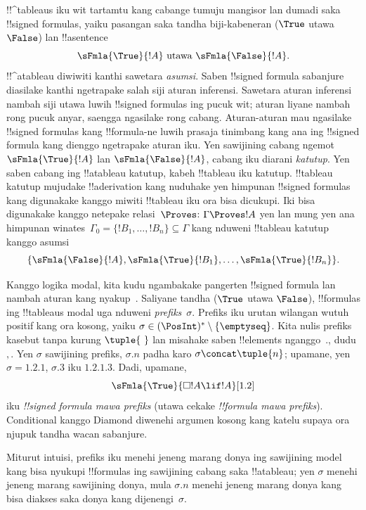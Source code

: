 \documentclass[../../../include/open-logic-section]{subfiles}
\begin{document}


!!^{tableau}s iku wit tartamtu kang cabange tumuju mangisor lan dumadi
saka !!{signed
  formula}s, yaiku pasangan saka tandha biji-kabeneran
($\True$ utawa $\False$) lan !!a{sentence}
\[
\sFmla{\True}{!A} \text{ utawa } \sFmla{\False}{!A}.
\]
!!^a{tableau} diwiwiti kanthi sawetara \emph{asumsi}. Saben
!!{signed formula} sabanjure diasilake kanthi ngetrapake salah siji
aturan inferensi. Sawetara aturan inferensi nambah siji utawa luwih
!!{signed formula}s ing pucuk wit; aturan liyane nambah rong pucuk
anyar, saengga ngasilake rong cabang. Aturan-aturan mau ngasilake
!!{signed formula}s kang !!{formula}-ne luwih prasaja tinimbang
kang ana ing !!{signed formula} kang dienggo ngetrapake aturan iku.
Yen sawijining cabang ngemot $\sFmla{\True}{!A}$ lan
$\sFmla{\False}{!A}$, cabang iku diarani \emph{katutup}. Yen saben
cabang ing !!a{tableau} katutup, kabeh !!{tableau} iku katutup.
!!{tableau} katutup mujudake !!a{derivation} kang nuduhake yen
himpunan !!{signed formula}s kang digunakake kanggo miwiti
!!{tableau} iku ora bisa dicukupi. Iki bisa digunakake kanggo
netepake relasi~$\Proves$:
$\Gamma \Proves !A$ yen lan mung yen ana himpunan winates~$\Gamma_0 = \{!B_1,
\dots, !B_n\} \subseteq \Gamma$ kang nduweni !!{tableau} katutup
kanggo asumsi
\[
\{\sFmla{\False}{!A}, \sFmla{\True}{!B_1}, \dots, \sFmla{\True}{!B_n}\}.
\]

Kanggo logika modal, kita kudu ngambakake pangerten !!{signed
formula} lan nambah aturan kang nyakup~. Saliyane tandha ($\True$ utawa
$\False$), !!{formula}s ing !!{tableau}s modal uga nduweni
\emph{prefiks}~$\sigma$. Prefiks iku urutan wilangan wutuh positif
kang ora kosong, yaiku $\sigma \in (\PosInt)^* \setminus
\{\emptyseq\}$. Kita nulis prefiks kasebut tanpa kurung
$\tuple{\ }$ lan misahake saben !!{element}s nganggo~$.$,
dudu $,$. Yen $\sigma$ sawijining prefiks, $\sigma.n$ padha karo $\sigma
\concat \tuple{n}$; upamane, yen $\sigma = 1.2.1$, $\sigma.3$ iku
$1.2.1.3$. Dadi, upamane,
\[
\sFmla{\True}{\Box !A \lif !A}[1.2]
\]
iku \emph{!!{signed formula} mawa prefiks} (utawa cekake
\emph{!!{formula} mawa prefiks}). Conditional kanggo Diamond diwenehi argumen kosong kang katelu supaya ora njupuk tandha wacan sabanjure.

Miturut intuisi, prefiks iku menehi jeneng marang donya ing sawijining
model kang bisa nyukupi !!{formula}s ing sawijining cabang saka
!!a{tableau}; yen $\sigma$ menehi jeneng marang sawijining donya,
mula $\sigma.n$ menehi jeneng marang donya kang bisa diakses saka
donya kang dijenengi~$\sigma$.
\end{document}
